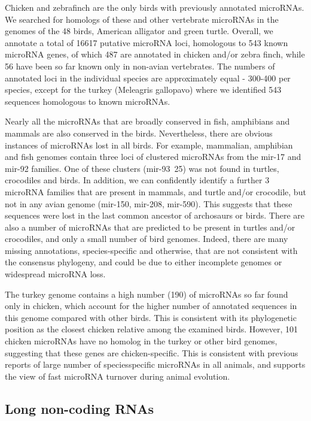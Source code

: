 \documentclass[10pt]{bmc_article}
\newenvironment{bmcformat}{\begin{raggedright}\baselineskip20pt\sloppy\setboolean{publ}{false}}{\end{raggedright}\baselineskip20pt\sloppy}
\begin{document}
\begin{bmcformat}
Chicken and zebrafinch are the only birds with previously annotated
microRNAs. We searched for homologs of these and other vertebrate
microRNAs in the genomes of the 48 birds, American alligator and green
turtle. Overall, we annotate a total of 16617 putative microRNA loci,
homologous to 543 known microRNA genes, of which 487 are annotated in
chicken and/or zebra finch, while 56 have been so far known only in
non-avian vertebrates. The numbers of annotated loci in the individual
species are approximately equal - 300-400 per species, except for the
turkey (Meleagris gallopavo) where we identified 543 sequences
homologous to known microRNAs.

Nearly all the microRNAs that are broadly conserved in fish,
amphibians and mammals are also conserved in the birds. Nevertheless,
there are obvious instances of microRNAs lost in all birds. For
example, mammalian, amphibian and fish genomes contain three loci of
clustered microRNAs from the mir-17 and mir-92 families. One of these
clusters (mir-93~25) was not found in turtles, crocodiles and
birds. In addition, we can confidently identify a further 3 microRNA
families that are present in mammals, and turtle and/or crocodile, but
not in any avian genome (mir-150, mir-208, mir-590). This suggests
that these sequences were lost in the last common ancestor of
archosaurs or birds. There are also a number of microRNAs that are
predicted to be present in turtles and/or crocodiles, and only a small
number of bird genomes. Indeed, there are many missing annotations,
species-specific and otherwise, that are not consistent with the
consensus phylogeny, and could be due to either incomplete genomes or
widespread microRNA loss.

The turkey genome contains a high number (190) of microRNAs so far
found only in chicken, which account for the higher number of
annotated sequences in this genome compared with other birds. This is
consistent with its phylogenetic position as the closest chicken
relative among the examined birds. However, 101 chicken microRNAs
have no homolog in the turkey or other bird genomes, suggesting that
these genes are chicken-specific. This is consistent with previous
reports of large number of speciesspecific microRNAs in all animals,
and supports the view of fast microRNA turnover during animal
evolution.

\subsection*{Long non-coding RNAs}


\end{bmcformat}
\end{document}
